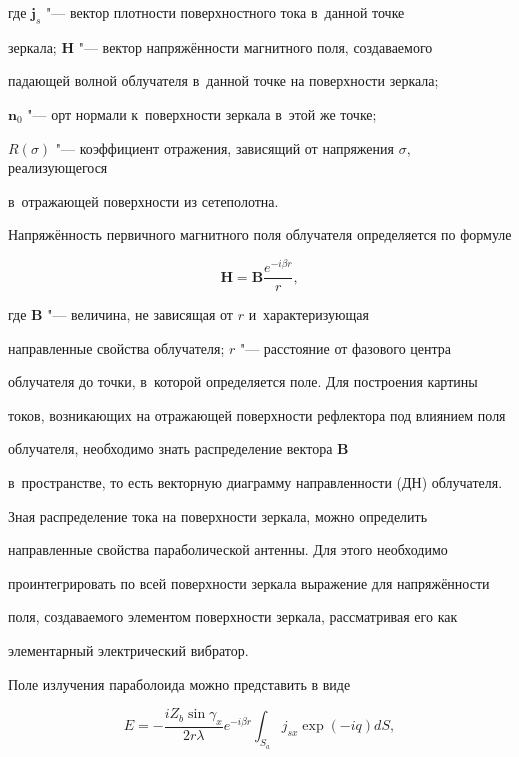 где $\boldsymbol j_{s}$ "--- вектор плотности поверхностного тока в~данной точке 

зеркала; $ \boldsymbol H$ "--- вектор напряжённости магнитного поля, создаваемого 

падающей волной облучателя в~данной точке на поверхности зеркала; 

$\boldsymbol n_0$ "--- орт нормали к~поверхности зеркала в~этой же точке; 

$R(\sigma )$ "--- коэффициент отражения, зависящий от напряжения $\sigma $, реализующегося 

в~отражающей поверхности из сетеполотна. 



Напряжённость первичного магнитного поля облучателя определяется по формуле

\begin{equation*}

\label{belkov:eq9}

\boldsymbol  H= \boldsymbol  B \frac{e^{-i\beta r}}{r},

\end{equation*}

где $\boldsymbol B$ "--- величина, не зависящая от $r$ и~характеризующая 

направленные свойства облучателя; $r$ "--- расстояние от фазового центра 

облучателя до точки, в~которой определяется поле. Для построения картины 

токов, возникающих на отражающей поверхности рефлектора под влиянием поля 

облучателя, необходимо знать распределение вектора $\boldsymbol B$ 

в~пространстве, то есть векторную диаграмму направленности (ДН) облучателя. 



Зная распределение тока на поверхности зеркала, можно определить 

направленные свойства параболической антенны. Для этого необходимо 

проинтегрировать по всей поверхности зеркала выражение для напряжённости 

поля, создаваемого элементом поверхности зеркала, рассматривая его как 

элементарный электрический вибратор.



Поле излучения параболоида можно представить в виде

\[

E=-\frac{iZ_b \sin \gamma _x }{2r\lambda }e^{-i\beta r}\int_{S_a} 

j_{sx} \exp (-iq) dS,

\]

